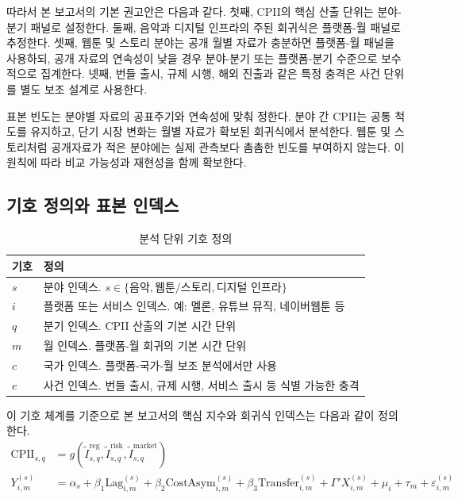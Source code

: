 \documentclass[11pt,a4paper]{report}
\begin{document}
따라서 본 보고서의 기본 권고안은 다음과 같다. 첫째, CPII의 핵심 산출 단위는 분야-분기 패널로 설정한다. 둘째, 음악과 디지털 인프라의 주된 회귀식은 플랫폼-월 패널로 추정한다. 셋째, 웹툰 및 스토리 분야는 공개 월별 자료가 충분하면 플랫폼-월 패널을 사용하되, 공개 자료의 연속성이 낮을 경우 분야-분기 또는 플랫폼-분기 수준으로 보수적으로 집계한다. 넷째, 번들 출시, 규제 시행, 해외 진출과 같은 특정 충격은 사건 단위를 별도 보조 설계로 사용한다.

표본 빈도는 분야별 자료의 공표주기와 연속성에 맞춰 정한다. 분야 간 CPII는 공통 척도를 유지하고, 단기 시장 변화는 월별 자료가 확보된 회귀식에서 분석한다. 웹툰 및 스토리처럼 공개자료가 적은 분야에는 실제 관측보다 촘촘한 빈도를 부여하지 않는다. 이 원칙에 따라 비교 가능성과 재현성을 함께 확보한다.

\subsection{기호 정의와 표본 인덱스}
\small
\begin{table}[H]
  \centering
  \caption{분석 단위 기호 정의}\label{tab:analysis_unit_symbols}
  \begin{tabular}{p{2.0cm}p{10.0cm}}
    \toprule
    \rowcolor{ReportTableHead}
    기호 & 정의 \\
    \midrule
    $s$ & 분야 인덱스. $s \in \{\text{음악}, \text{웹툰/스토리}, \text{디지털 인프라}\}$ \\
    $i$ & 플랫폼 또는 서비스 인덱스. 예: 멜론, 유튜브 뮤직, 네이버웹툰 등 \\
    $q$ & 분기 인덱스. CPII 산출의 기본 시간 단위 \\
    $m$ & 월 인덱스. 플랫폼-월 회귀의 기본 시간 단위 \\
    $c$ & 국가 인덱스. 플랫폼-국가-월 보조 분석에서만 사용 \\
    $e$ & 사건 인덱스. 번들 출시, 규제 시행, 서비스 출시 등 식별 가능한 충격 \\
    \bottomrule
  \end{tabular}
\end{table}
\normalsize

이 기호 체계를 기준으로 본 보고서의 핵심 지수와 회귀식 인덱스는 다음과 같이 정의한다.
\begin{align}
\mathrm{CPII}_{s,q} &= g\!\left(\widetilde{I}^{\mathrm{reg}}_{s,q}, \widetilde{I}^{\mathrm{risk}}_{s,q}, \widetilde{I}^{\mathrm{market}}_{s,q}\right) \\
Y_{i,m}^{(s)} &= \alpha_s + \beta_1 \mathrm{Lag}_{i,m}^{(s)} + \beta_2 \mathrm{CostAsym}_{i,m}^{(s)} + \beta_3 \mathrm{Transfer}_{i,m}^{(s)} + \Gamma' X_{i,m}^{(s)} + \mu_i + \tau_m + \varepsilon_{i,m}^{(s)}
\end{align}
\end{document}
